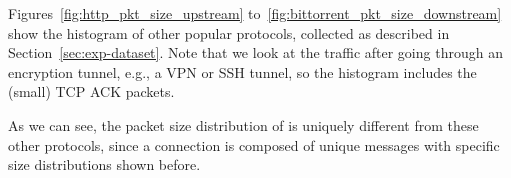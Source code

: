 Figures~\ref{fig:http_pkt_size_upstream} to~\ref{fig:bittorrent_pkt_size_downstream}  show the histogram of other popular protocols, collected as described in Section~\ref{sec:exp-dataset}. Note that we look at the traffic after going through an encryption tunnel, e.g., a VPN or SSH tunnel, so the histogram includes the (small) TCP ACK packets. 

As we can see, 
the packet size distribution of \bc is uniquely different from these other protocols, since a \bc connection is composed of unique messages with specific size distributions shown before.%



